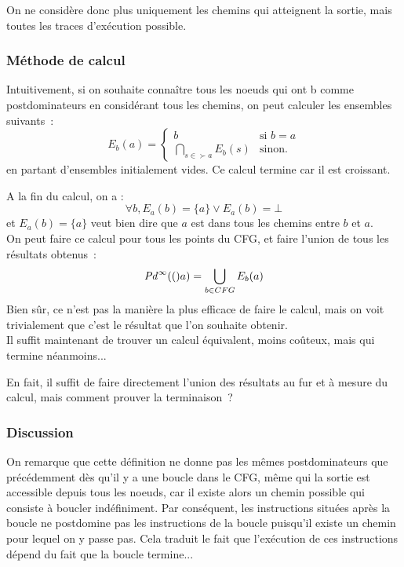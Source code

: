 On ne considère donc plus uniquement les chemins qui atteignent la sortie,
mais toutes les traces d'exécution possible.


\subsubsection{Méthode de calcul}


Intuitivement, si on souhaite connaître tous les noeuds qui ont b comme
postdominateurs en considérant tous les chemins,
on peut calculer les ensembles suivants~:
$$
E_b (a) = \left\{
\begin{array}{ll}
  {b} & \text{si } b = a\\
  \bigcap_{s \in \succ{a}} E_b(s) & \text{sinon.}
\end{array}\right.
$$
en partant d'ensembles initialement vides.
Ce calcul termine car il est croissant.

A la fin du calcul, on a :
$$
  \forall b, E_a (b) = \{ a \} \vee E_a (b) = \bot
$$
et $E_a (b) = \{ a \}$ veut bien dire que $a$ est dans tous les chemins entre
$b$ et $a$.\\

On peut faire ce calcul pour tous les points du CFG, et faire l'union de tous
les résultats obtenus~:
$$
\mathit{Pd}^{\infty}(\mathfrak{(})a) = \bigcup_{b \in CFG} E_b(a)
$$
Bien sûr, ce n'est pas la manière la plus efficace de faire le calcul,
mais on voit trivialement que c'est le résultat que l'on souhaite obtenir.\\

Il suffit maintenant de trouver un calcul équivalent,
moins coûteux, mais qui termine néanmoins...

En fait, il suffit de faire directement
l'union des résultats au fur et à mesure du calcul,
mais comment prouver la terminaison~?

\subsubsection{Discussion}

On remarque que cette définition ne donne pas
les mêmes postdominateurs que précédemment
dès qu'il y a une boucle dans le CFG, même qui la sortie \nE{} est accessible
depuis tous les noeuds,
car il existe alors un chemin possible qui consiste à boucler indéfiniment.
Par conséquent, les instructions situées après la boucle ne postdomine pas les
instructions de la boucle puisqu'il existe un chemin pour lequel on y passe pas.
Cela traduit le fait que l'exécution de ces instructions dépend du fait que la
boucle termine...

